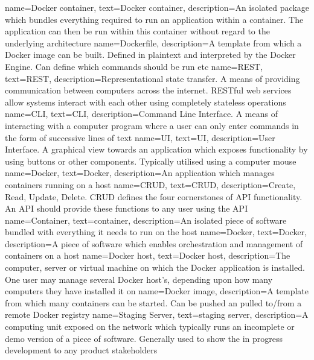 {
    name={Docker container},
    text={Docker container},
    description={An isolated package which bundles everything required to run an application within a container. The application can then be run within this container without regard to the underlying architecture}
}
{
    name={Dockerfile},
    description={A template from which a Docker image can be built. Defined in plaintext and interpreted by the Docker Engine. Can define which commands should be run etc}
}
{
    name={REST},
    text={REST},
    description={Representational state transfer. A means of providing communication between computers across the internet. RESTful web services allow systems interact with each other using completely stateless operations}
}
{
    name={CLI},
    text={CLI},
    description={Command Line Interface. A means of interacting with a computer program where a user can only enter commands in the form of successive lines of text}
}
{
    name={UI},
    text={UI},
    description={User Interface. A graphical view towards an application which exposes functionality by using buttons or other components. Typically utilised using a computer mouse}
}
{
    name={Docker},
    text={Docker},
    description={An application which manages containers running on a host}
}
{
    name={CRUD},
    text={CRUD},
    description={Create, Read, Update, Delete. CRUD defines the four cornerstones of API functionality. An API should provide these functions to any user using the API}
}
{
    name={Container},
    text={container},
    description={An isolated piece of software bundled with everything it needs to run on the host}
}
{
		name={Docker},
    text={Docker},
		description={A piece of software which enables orchestration and management of containers on a host}
}
{
		name={Docker host},
    text={Docker host},
		description={The computer, server or virtual machine on which the Docker application is installed. One user may manage several Docker host's, depending upon how many computers they have installed it on}
}
{
		name={Docker image},
		description={A template from which many containers can be started. Can be pushed an pulled to/from a remote Docker registry}
}
{
		name={Staging Server},
		text={staging server},
		description={A computing unit exposed on the network which typically runs an incomplete or demo version of a piece of software. Generally used to show the in progress development to any product stakeholders}
}
